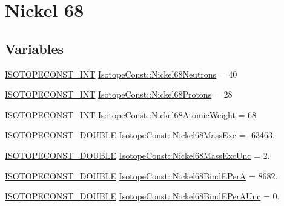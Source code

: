 \hypertarget{group___isotope_const-_nickel-_ni68}{}\section{Nickel 68}
\label{group___isotope_const-_nickel-_ni68}
\subsection*{Variables}
\begin{DoxyCompactItemize}
\item 
\mbox{\hyperlink{group___isotope_const-_macros_ga5f18360b3e99483a35c32d789e62621c}{I\+S\+O\+T\+O\+P\+E\+C\+O\+N\+S\+T\+\_\+\+I\+NT}} \mbox{\hyperlink{group___isotope_const-_nickel-_ni68_ga2861a1a3d20d8120905fc45b3f7c608f}{Isotope\+Const\+::\+Nickel68\+Neutrons}} = 40
\item 
\mbox{\hyperlink{group___isotope_const-_macros_ga5f18360b3e99483a35c32d789e62621c}{I\+S\+O\+T\+O\+P\+E\+C\+O\+N\+S\+T\+\_\+\+I\+NT}} \mbox{\hyperlink{group___isotope_const-_nickel-_ni68_gae4d1bd6dc23172f12ec761d57530d1ea}{Isotope\+Const\+::\+Nickel68\+Protons}} = 28
\item 
\mbox{\hyperlink{group___isotope_const-_macros_ga5f18360b3e99483a35c32d789e62621c}{I\+S\+O\+T\+O\+P\+E\+C\+O\+N\+S\+T\+\_\+\+I\+NT}} \mbox{\hyperlink{group___isotope_const-_nickel-_ni68_ga66a5f1e30ce13567cd827cfdc671b058}{Isotope\+Const\+::\+Nickel68\+Atomic\+Weight}} = 68
\item 
\mbox{\hyperlink{group___isotope_const-_macros_ga8f45a7272ce02c0b4c65c44636ed719a}{I\+S\+O\+T\+O\+P\+E\+C\+O\+N\+S\+T\+\_\+\+D\+O\+U\+B\+LE}} \mbox{\hyperlink{group___isotope_const-_nickel-_ni68_gad3c9e7d89345f97fa87b347cba1008e9}{Isotope\+Const\+::\+Nickel68\+Mass\+Exc}} = -\/63463.
\item 
\mbox{\hyperlink{group___isotope_const-_macros_ga8f45a7272ce02c0b4c65c44636ed719a}{I\+S\+O\+T\+O\+P\+E\+C\+O\+N\+S\+T\+\_\+\+D\+O\+U\+B\+LE}} \mbox{\hyperlink{group___isotope_const-_nickel-_ni68_ga45a00dacae69159d94966f273e9f3776}{Isotope\+Const\+::\+Nickel68\+Mass\+Exc\+Unc}} = 2.
\item 
\mbox{\hyperlink{group___isotope_const-_macros_ga8f45a7272ce02c0b4c65c44636ed719a}{I\+S\+O\+T\+O\+P\+E\+C\+O\+N\+S\+T\+\_\+\+D\+O\+U\+B\+LE}} \mbox{\hyperlink{group___isotope_const-_nickel-_ni68_gac19dc9a605f13f9102715a52fb63e604}{Isotope\+Const\+::\+Nickel68\+Bind\+E\+PerA}} = 8682.
\item 
\mbox{\hyperlink{group___isotope_const-_macros_ga8f45a7272ce02c0b4c65c44636ed719a}{I\+S\+O\+T\+O\+P\+E\+C\+O\+N\+S\+T\+\_\+\+D\+O\+U\+B\+LE}} \mbox{\hyperlink{group___isotope_const-_nickel-_ni68_gae7055a750c624b4a046e646989e04828}{Isotope\+Const\+::\+Nickel68\+Bind\+E\+Per\+A\+Unc}} = 0.

\end{DoxyCompactItemize}

